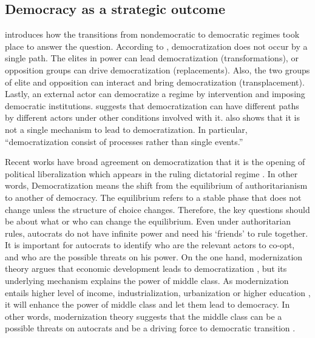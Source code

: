 \documentclass[11pt]{article}
\begin{document}
\subsection*{Democracy as a strategic outcome}

\citet{Huntington1993} introduces how the transitions from nondemocratic to democratic regimes took place to answer the question. According to \citet{Huntington1993}, democratization does not occur by a single path. The elites in power can lead democratization (transformations), or opposition groups can drive democratization (replacements). Also, the two groups of elite and opposition can interact and bring democratization (transplacement). Lastly, an external actor can democratize a regime by intervention and imposing democratic institutions. \citet{Huntington1993} suggests that democratization can
have different paths by different actors under other conditions involved with it. \citet[797]{Treisman2020} also shows that it is not a single mechanism to lead to democratization. In particular, ``democratization consist of processes rather than single events.''

Recent works have broad agreement on democratization that it is the opening of political liberalization which appears in the ruling dictatorial regime \citep[7]{Carothers2002a}. In other words, Democratization means the shift from the equilibrium of authoritarianism to another of democracy. The equilibrium refers to a stable phase that does not change unless the structure of choice changes. Therefore, the key questions should be about what or who can change the equilibrium. Even under authoritarian rules, autocrats do not have infinite power and need his `friends' to rule together. It is important for autocrats to identify who are the relevant actors to co-opt, and who are the possible threats on his power. On the one hand, modernization theory argues that
economic development leads to democratization \citep{Huntington1993}, but its underlying mechanism explains the power of middle class. As modernization entails higher level of income, industrialization, urbanization or higher education \citep{Lipset1959a}, it will enhance the power of middle class and let them lead to democracy. In other words, modernization theory suggests that the middle class can be a possible threats on autocrats and be a driving force to democratic transition \citep{Moore1966}.
\end{document}
